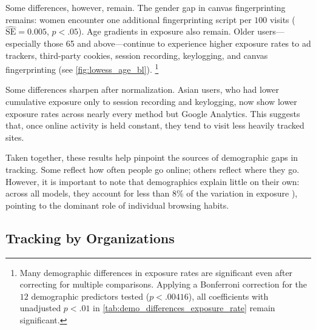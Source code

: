 \documentclass[12pt, letterpaper]{article}
\begin{document}
Some differences, however, remain. The gender gap in canvas fingerprinting remains: women encounter one additional fingerprinting script per $100$ visits ($\widehat{\mathrm{SE}} = 0.005$, $p < .05$). Age gradients in exposure also remain. Older users—especially those 65 and above—continue to experience higher exposure rates to ad trackers, third-party cookies, session recording, keylogging, and canvas fingerprinting (see \cref{fig:lowess_age_bl}).%
\footnote{
    \label{fn:bonferroni}
    Many demographic differences in exposure rates are significant even after correcting for multiple comparisons. Applying a Bonferroni correction for the $12$ demographic predictors tested ($p < .00416$), all coefficients with unadjusted $p < .01$ in \cref{tab:demo_differences_exposure_rate} remain significant.
}

Some differences sharpen after normalization.  Asian users, who had lower cumulative exposure only to session recording and keylogging, now show lower exposure rates across nearly every method but Google Analytics. This suggests that, once online activity is held constant, they tend to visit less heavily tracked sites.

Taken together, these results help pinpoint the sources of demographic gaps in tracking. Some reflect how often people go online; others reflect where they go. However, it is important to note that demographics explain little on their own: across all models, they account for less than 8\% of the variation in exposure  ), pointing to the dominant role of individual browsing habits.

\subsection{Tracking by Organizations}
\label{sec:tracker_organizations}
\end{document}
